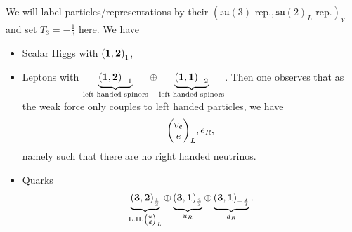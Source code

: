 We will label particles/representations by their $\left( \mathfrak{su} \left( 3 \right) \text{~rep.}, \mathfrak{su}\left( 2 \right)_L \text{~rep.} \right)_Y$ and set $T_3 = -\frac{1}{3}$ here. We have
\begin{itemize}
    \item Scalar Higgs with $\left( \vb{1}, \vb{2} \right)_1$,
\item Leptons with $\underbrace{\left( \vb{1}, \vb{2} \right)_{-1}}_{\text{left handed spinors}} \oplus \underbrace{\left( \vb{1}, \vb{1} \right)_{-2}}_{\text{left handed spinors}}$. Then one observes that as the weak force only couples to left handed particles, we have
    \begin{align}
        \mqty( v_e \\ e )_L , e_R
    ,\end{align}
    namely such that there are no right handed neutrinos.
\item Quarks
    \begin{align}
        \underbrace{\left( \vb{3}, \vb{2} \right)_{\frac{1}{3}}}_{\text{L.H.} \tiny \mqty( u \\ d )_L} \oplus \underbrace{\left( \vb{3},\vb{1} \right)_{\frac{4}{3}} }_{u_R} \oplus \underbrace{\left( \vb{3}, \vb{1} \right)_{-\frac{2}{3}}}_{d_R}
    .\end{align}
\end{itemize}
